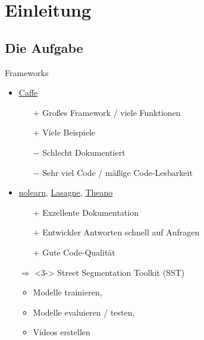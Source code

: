 \section{Einleitung}

\subsection{Die Aufgabe}


\begin{frame}{Frameworks}
    \begin{itemize}
        \item<1-> \href{http://caffe.berkeleyvision.org/}{Caffe}
        \begin{itemize}
            \item[$+$] Großes Framework / viele Funktionen
            \item[$+$] Viele Beispiele
            \item[$-$] Schlecht Dokumentiert
            \item[$-$] Sehr viel Code / mäßige Code-Lesbarkeit
        \end{itemize}
        \item<2-> \href{https://github.com/dnouri/nolearn}{nolearn}, \href{https://github.com/Lasagne/Lasagne}{Lasagne}, \href{https://github.com/Theano/Theano}{Theano}
        \begin{itemize}
            \item[$+$] Exzellente Dokumentation
            \item[$+$] Entwickler Antworten schnell auf Anfragen
            \item[$+$] Gute Code-Qualität
        \end{itemize}
        \item[$\Rightarrow$]<3-> Street Segmentation Toolkit (SST)
        \begin{itemize}
            \item Modelle trainieren,
            \item Modelle evaluieren / testen,
            \item Videos erstellen
        \end{itemize}
    \end{itemize}
\end{frame}